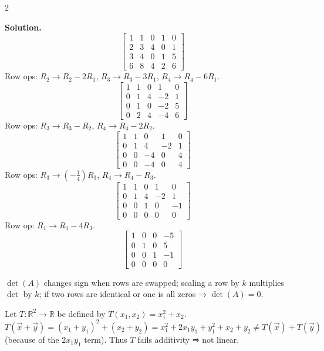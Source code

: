 \documentclass[8pt]{extarticle}
\begin{document}
\begin{multicols}{2}
\begin{tcolorbox}[title=]
\textbf{Solution.}
\[
\begin{bmatrix}
1&1&0&1&0\\
2&3&4&0&1\\
3&4&0&1&5\\
6&8&4&2&6
\end{bmatrix}
\]
Row ops: \(R_{2}\!\to\!R_{2}-2R_{1}\), \(R_{3}\!\to\!R_{3}-3R_{1}\), \(R_{4}\!\to\!R_{4}-6R_{1}\).
\[
\begin{bmatrix}
1&1&0&1&0\\
0&1&4&-2&1\\
0&1&0&-2&5\\
0&2&4&-4&6
\end{bmatrix}
\]
Row ops: \(R_{3}\!\to\!R_{3}-R_{2}\), \(R_{4}\!\to\!R_{4}-2R_{2}\).
\[
\begin{bmatrix}
1&1&0&1&0\\
0&1&4&-2&1\\
0&0&-4&0&4\\
0&0&-4&0&4
\end{bmatrix}
\]
Row ops: \(R_{3}\!\to\!(-\tfrac14)R_{3}\), \(R_{4}\!\to\!R_{4}-R_{3}\).
\[
\begin{bmatrix}
1&1&0&1&0\\
0&1&4&-2&1\\
0&0&1&0&-1\\
0&0&0&0&0
\end{bmatrix}
\]
Row op: \(R_{1}\!\to\!R_{1}-4R_{3}\).
\[
\boxed{
\begin{bmatrix}
1&0&0&-5\\
0&1&0&5\\
0&0&1&-1\\
0&0&0&0
\end{bmatrix}}
\]
\end{tcolorbox}

\begin{tcolorbox}[title=Quick Determinant Tips, colframe=black!60!white, colback=gray!2]
\small
\(\det(A)\) changes sign when rows are swapped;  
scaling a row by \(k\) multiplies \(\det\) by \(k\);  
if two rows are identical or one is all zeros → \(\det(A)=0\).
\end{tcolorbox}

\begin{tcolorbox}[title=Example – Transformation That Is Not Linear]
Let \(T:\mathbb{R}^2\to\mathbb{R}\) be defined by \(T(x_1,x_2)=x_1^2+x_2.\)
\[
T(\vec{x}+\vec{y})=(x_1+y_1)^2+(x_2+y_2)
=x_1^2+2x_1y_1+y_1^2+x_2+y_2
\neq T(\vec{x})+T(\vec{y})
\]
(because of the \(2x_1y_1\) term).  
Thus \(T\) fails additivity ⇒ not linear.
\end{tcolorbox}


\end{multicols}
\end{document}
